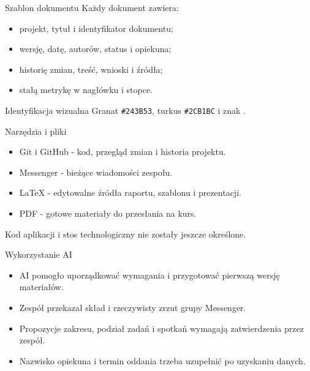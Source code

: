 \documentclass[aspectratio=169,11pt]{beamer}
\begin{document}
\begin{frame}{Szablon dokumentu}
  Każdy dokument zawiera:
  \begin{itemize}
    \item projekt, tytuł i identyfikator dokumentu;
    \item wersję, datę, autorów, status i opiekuna;
    \item historię zmian, treść, wnioski i źródła;
    \item stałą metrykę w nagłówku i stopce.
  \end{itemize}
  \vfill
  \begin{block}{Identyfikacja wizualna}
    Granat \texttt{\#243B53}, turkus \texttt{\#2CB1BC} i znak \RankItWordmark.
  \end{block}
\end{frame}

\begin{frame}{Narzędzia i pliki}
  \begin{itemize}
    \item Git i GitHub - kod, przegląd zmian i historia projektu.
    \item Messenger - bieżące wiadomości zespołu.
    \item LaTeX - edytowalne źródła raportu, szablonu i prezentacji.
    \item PDF - gotowe materiały do przesłania na kurs.
  \end{itemize}
  \vfill
  \small Kod aplikacji i stos technologiczny nie zostały jeszcze określone.
\end{frame}

\begin{frame}{Wykorzystanie AI}
  \begin{itemize}
    \item AI pomogło uporządkować wymagania i przygotować pierwszą wersję materiałów.
    \item Zespół przekazał skład i rzeczywisty zrzut grupy Messenger.
    \item Propozycje zakresu, podział zadań i spotkań wymagają zatwierdzenia przez zespół.
    \item Nazwisko opiekuna i termin oddania trzeba uzupełnić po uzyskaniu danych.
  \end{itemize}
\end{frame}
\end{document}
